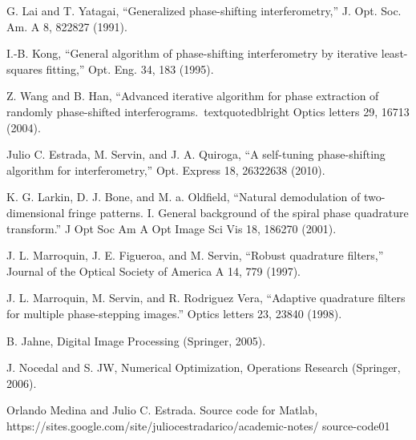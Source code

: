 \begin{thebibliography}{99}
G. Lai and T. Yatagai, \textquotedblleft{}Generalized
phase-shifting interferometry,\textquotedblright{} J. Opt. Soc. Am.
A 8, 822\textendash{}827 (1991).

 I.-B. Kong, \textquotedblleft{}General algorithm
of phase-shifting interferometry by iterative least-squares
fitting,\textquotedblright{}
Opt. Eng. 34, 183 (1995).

 Z. Wang and B. Han, \textquotedblleft{}Advanced iterative
algorithm for phase extraction of randomly phase-shifted interferograms.\
textquotedblright{}
Optics letters 29, 1671\textendash{}3 (2004).

 Julio C. Estrada, M. Servin, and J. A. Quiroga,
\textquotedblleft{}A self-tuning phase-shifting algorithm for
interferometry,\textquotedblright{}
Opt. Express 18, 2632\textendash{}2638 (2010).

 K. G. Larkin, D. J. Bone, and M. a. Oldfield,
\textquotedblleft{}Natural
demodulation of two-dimensional fringe patterns. I. General background
of the spiral phase quadrature transform.\textquotedblright{} J Opt
Soc Am A Opt Image Sci Vis 18, 1862\textendash{}70 (2001).

 J. L. Marroquin, J. E. Figueroa, and M. Servin,
\textquotedblleft{}Robust
quadrature filters,\textquotedblright{} Journal of the Optical Society
of America A 14, 779 (1997).

 J. L. Marroquin, M. Servin, and R. Rodriguez Vera,
\textquotedblleft{}Adaptive quadrature filters for multiple phase-stepping
images.\textquotedblright{} Optics letters 23, 238\textendash{}40
(1998).

 B. Jahne, Digital Image Processing (Springer, 2005).

 J. Nocedal and S. JW, Numerical Optimization, Operations
Research (Springer, 2006).

 Orlando Medina and Julio C. Estrada. Source code
for Matlab, https://sites.google.com/site/juliocestradarico/academic-notes/
source-code01

\end{thebibliography}
